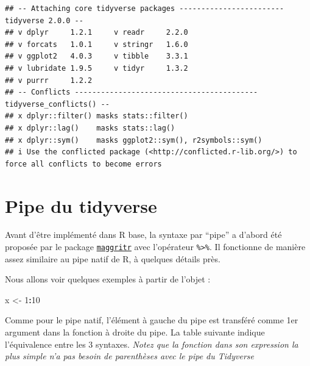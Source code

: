 \documentclass[
]{book}
\newenvironment{Shaded}{\begin{snugshade}}{\end{snugshade}}
\newcommand{\DecValTok}[1]{\textcolor[rgb]{0.00,0.00,0.81}{#1}}
\newcommand{\NormalTok}[1]{#1}
\newcommand{\OtherTok}[1]{\textcolor[rgb]{0.56,0.35,0.01}{#1}}
\newcommand{\SpecialCharTok}[1]{\textcolor[rgb]{0.81,0.36,0.00}{\textbf{#1}}}
\begin{document}
\begin{verbatim}
## -- Attaching core tidyverse packages ------------------------ tidyverse 2.0.0 --
## v dplyr     1.2.1     v readr     2.2.0
## v forcats   1.0.1     v stringr   1.6.0
## v ggplot2   4.0.3     v tibble    3.3.1
## v lubridate 1.9.5     v tidyr     1.3.2
## v purrr     1.2.2     
## -- Conflicts ------------------------------------------ tidyverse_conflicts() --
## x dplyr::filter() masks stats::filter()
## x dplyr::lag()    masks stats::lag()
## x dplyr::sym()    masks ggplot2::sym(), r2symbols::sym()
## i Use the conflicted package (<http://conflicted.r-lib.org/>) to force all conflicts to become errors
\end{verbatim}

\section{Pipe du tidyverse}\label{pipe-du-tidyverse}

Avant d'être implémenté dans R base, la syntaxe par ``pipe'' a d'abord été proposée par le package \href{https://magrittr.tidyverse.org/}{\texttt{maggritr}} avec l'opérateur \texttt{\%\textgreater{}\%}. Il fonctionne de manière assez similaire au pipe natif de R, à quelques détails près.

Nous allons voir quelques exemples à partir de l'objet :

\begin{Shaded}
\begin{Highlighting}[]
\NormalTok{x }\OtherTok{\textless{}{-}} \DecValTok{1}\SpecialCharTok{:}\DecValTok{10}
\end{Highlighting}
\end{Shaded}

Comme pour le pipe natif, l'élément à gauche du pipe est transféré comme 1er argument dans la fonction à droite du pipe. La table suivante indique l'équivalence entre les 3 syntaxes. \emph{Notez que la fonction dans son expression la plus simple n'a pas besoin de parenthèses avec le pipe du Tidyverse}
\end{document}
